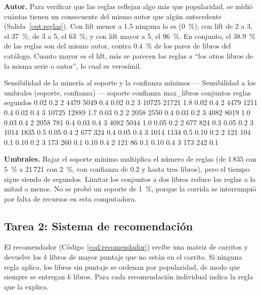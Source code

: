 \documentclass[11pt,letterpaper]{article}
\begin{document}
\textbf{Autor.} Para verificar que las reglas reflejan algo más que popularidad, se midió cuántas tienen un consecuente del mismo autor que algún antecedente (Salida~\ref{out:reglas}). Con lift menor a 1.5 ninguna lo es (0~\%); con lift de 2 a 3, el 37~\%; de 3 a 5, el 63~\%; y con lift mayor a 5, el 96~\%. En conjunto, el 38.9~\% de las reglas son del mismo autor, contra 0.4~\% de los pares de libros del catálogo. Cuanto mayor es el lift, más se parecen las reglas a ``los otros libros de la misma serie o autor'', lo cual es verosímil.

\begin{consola}[label=out:sens1]{Sensibilidad de la minería al soporte y la confianza mínimos}
--- Sensibilidad a los umbrales (soporte, confianza) ---
 soporte  confianza  max_libros  conjuntos  reglas  segundos
    0.02        0.2           2       4479    5049       0.4
    0.02        0.2           3      10725   21721       1.8
    0.02        0.4           2       4479    1211       0.4
    0.02        0.4           3      10725   12889       1.7
    0.03        0.2           2       2058    2550       0.4
    0.03        0.2           3       4082    8019       1.0
    0.03        0.4           2       2058     781       0.4
    0.03        0.4           3       4082    5044       1.0
    0.05        0.2           2        677     824       0.3
    0.05        0.2           3       1014    1835       0.5
    0.05        0.4           2        677     324       0.4
    0.05        0.4           3       1014    1134       0.5
    0.10        0.2           2        121     104       0.1
    0.10        0.2           3        173     260       0.1
    0.10        0.4           2        121      86       0.1
    0.10        0.4           3        173     242       0.1
\end{consola}

\textbf{Umbrales.} Bajar el soporte mínimo multiplica el número de reglas (de 1\,835 con 5~\% a 21\,721 con 2~\%, con confianza de 0.2 y hasta tres libros), pero el tiempo sigue siendo de segundos. Limitar los conjuntos a dos libros reduce las reglas a la mitad o menos. No se probó un soporte de 1~\%, porque la corrida se interrumpió por falta de recursos en esta computadora.

\subsection{Tarea 2: Sistema de recomendación}

El recomendador (Código~\ref{cod:recomendador}) recibe una matriz de carritos y devuelve los $k$ libros de mayor puntaje que no están en el carrito. Si ninguna regla aplica, los libros sin puntaje se ordenan por popularidad, de modo que siempre se entregan $k$ libros. Para cada recomendación individual indica la regla que la explica.
\end{document}
